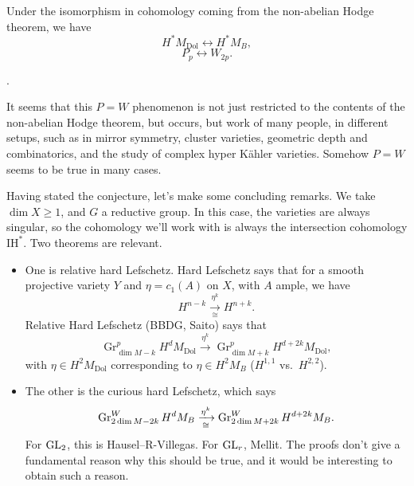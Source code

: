 \documentclass[reqno]{amsart} 
\begin{document}
\begin{conjecture}[$P = W$, de Cataldo--Hausel--Migliorini, 2008]
  Under the isomorphism in cohomology coming from the non-abelian Hodge theorem, we have
  \begin{equation*}
    H^\ast M_{\mathrm{Dol}} \leftrightarrow H^\ast M_B,
  \end{equation*}
  \begin{equation*}
    P_p \leftrightarrow W_{2 p}.
  \end{equation*}
\end{conjecture}
\begin{theorem}[$P=W$ for Riemann surfaces $X$, $\GL_r$, coprime case; 2022: Maulik--Shen, Hausel--Mellit--Minets--Schiffmann; 2023: Maulik--Shen--Yin]
  .
\end{theorem}

It seems that this $P = W$ phenomenon is not just restricted to the contents of the non-abelian Hodge theorem, but occurs, but work of many people, in different setups, such as in mirror symmetry, cluster varieties, geometric depth and combinatorics, and the study of complex hyper K\"{a}hler varieties.  Somehow $P = W$ seems to be true in many cases.

Having stated the conjecture, let's make some concluding remarks.  We take $\dim X \geq 1$, and $G$ a reductive group.  In this case, the varieties are always singular, so the cohomology we'll work with is always the intersection cohomology $\mathrm{IH}^\ast$.  Two theorems are relevant.

\begin{itemize}
\item One is relative hard Lefschetz.  Hard Lefschetz says that for a smooth projective variety $Y$ and $\eta = c_1(A)$ on $X$, with $A$ ample, we have
  \begin{equation*}
    H^{n - k} \xrightarrow[\cong]{\eta^k} H^{n + k}.
  \end{equation*}
  Relative Hard Lefschetz (BBDG, Saito) says that
  \begin{equation*}
    \operatorname{Gr}^p_{\dim M - k} H^d M_{\mathrm{Dol}} \xrightarrow{\eta^k}
    \operatorname{Gr}^p_{\dim M + k} H^{d + 2 k} M_{\mathrm{Dol}},
  \end{equation*}
  with $\eta \in H^2 M_{\mathrm{Dol}}$ corresponding to $\eta \in H^2 M_B$ ($H^{1, 1}$ vs.\ $H^{2, 2}$).
\item The other is the curious hard Lefschetz, which says
  \begin{equation*}
    \operatorname{Gr}^W_{2 \dim M - 2 k} H^d M_{B} \xrightarrow[\cong]{\eta^k}
    \operatorname{Gr}^W_{2 \dim M + 2 k} H^{d + 2 k} M_B .
  \end{equation*}
  For $\operatorname{GL}_2$, this is Hausel--R-Villegas.  For $\GL_r$, Mellit.  The proofs don't give a fundamental reason why this should be true, and it would be interesting to obtain such a reason.
\end{itemize}
\end{document}
